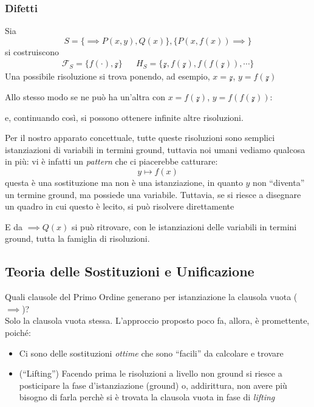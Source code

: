 \subsubsection{Difetti}
Sia 
$$
S = \{\implies P(x,y), Q(x)\}, \{P(x,f(x)) \implies \}
$$
si costruiscono 
\begin{align*}
\mathscr{F}_S = \{f(\cdot), \mathcal{z}\} &&
H_S=\{\mathcal{z}, f(\mathcal{z}), f(f(\mathcal{z})), \cdots \}
\end{align*}
Una possibile risoluzione si trova ponendo, ad esempio, $x = \mathcal{z}$, $y = f(\mathcal{z})$ 
\begin{prooftree}
\end{prooftree}
Allo stesso modo se ne può ha un'altra con  $x = f(\mathcal{z})$, $y = f(f(\mathcal{z}))$: 
\begin{prooftree}
\end{prooftree}
e, continuando così, si possono ottenere infinite altre risoluzioni.

Per il nostro apparato concettuale, tutte queste risoluzioni sono semplici istanziazioni di variabili in termini ground, tuttavia noi umani vediamo qualcosa in più: vi è infatti un \textit{pattern} che ci piacerebbe catturare:
$$
y \mapsto f(x)
$$
questa è una sostituzione ma non è una istanziazione, in quanto $y$ non ``diventa'' un termine ground, ma possiede una variabile. Tuttavia, se si riesce a disegnare un quadro in cui questo è lecito, si può risolvere direttamente 
\begin{prooftree}
\end{prooftree}
E da $\implies Q(x)$ si può ritrovare, con le istanziazioni delle variabili in termini ground, tutta la famiglia di risoluzioni.

\subsection{Teoria delle Sostituzioni e Unificazione}
Quali clausole del Primo Ordine generano per istanziazione la clausola vuota ($\implies$)? \\
Solo la clausola vuota stessa. L'approccio proposto poco fa, allora, è promettente, poiché: 
\begin{itemize}
  \item Ci sono delle sostituzioni \textit{ottime} che sono ``facili'' da calcolare e trovare 
   \item (``Lifting'') Facendo prima le risoluzioni a livello non ground si riesce a posticipare la fase d'istanziazione (ground) o, addirittura, non avere più bisogno di farla perchè si è trovata la clausola vuota in fase di \textit{lifting}
\end{itemize}


